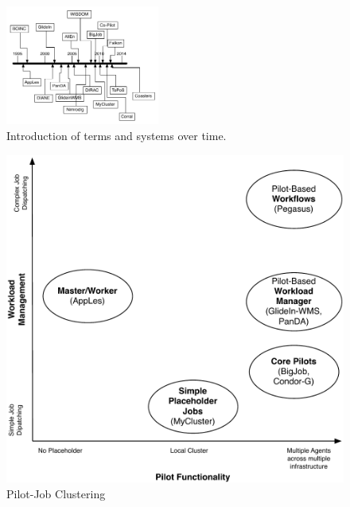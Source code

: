 \documentclass{sig-alternate}
\begin{document}
%


%
%

%
%
\begin{figure}[t]
  \centering
    \includegraphics[width=0.45\textwidth]{figures/timeline}
    \caption{Introduction of terms and systems over time.}
    \label{fig:timeline}
\end{figure}

\begin{figure}[t]
	\centering
		\includegraphics[width=.45\textwidth]{figures/pilotjob-clustering.pdf}
	\caption{Pilot-Job Clustering}
	\label{fig:pilotjob_clustering}
\end{figure}
\end{document}
